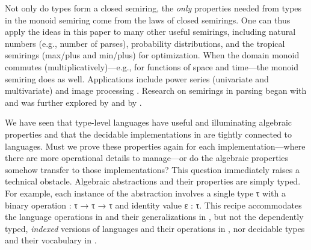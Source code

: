 \documentclass[acmsmall,screen,timestamp]{acmart}  %
\begin{document}
Not only do types form a closed semiring, the \emph{only} properties needed from types in the monoid semiring come from the laws of closed semirings.
One can thus apply the ideas in this paper to many other useful semirings, including natural numbers (e.g., number of parses), probability distributions, and the tropical semirings (max/plus and min/plus) for optimization.
When the domain monoid commutes (multiplicatively)---e.g., for functions of space and time---the monoid semiring does as well.
Applications include power series (univariate and multivariate) and image processing \citep{Elliott2019-convolution}.
Research on semirings in parsing began with \citet{Chomsky1959CFL} and was further explored by \citet{Goodman1998PIO, Goodman1999SP} and by \citet{Liu2004}.


\rnc{}

We have seen that type-level languages have useful and illuminating algebraic properties and that the decidable implementations in  are tightly connected to languages.
Must we prove these properties again for each implementation---where there are more operational details to manage---or do the algebraic properties somehow transfer to those implementations?
This question immediately raises a technical obstacle.
Algebraic abstractions and their properties are simply typed.
For example, each instance of the  abstraction involves a single type \AB τ with a binary operation { \AK : \AB τ \AK → \AB τ \AK → \AB τ} and identity value {\AB ε \AK : \AB τ}.
This recipe accommodates the language operations in  and their generalizations in , but not the dependently typed, \emph{indexed} versions of languages and their operations in , nor decidable types and their vocabulary in .
\end{document}
